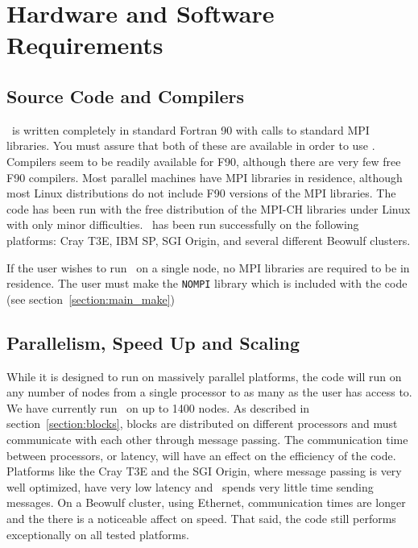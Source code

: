 \section{Hardware and Software Requirements \label{section:requirements}}

\subsection{Source Code and Compilers \label{section:compiler}}

\BATSRUS\ is written completely in standard Fortran 90 with calls to
standard MPI libraries.  You must assure that both of these are available
in order to
use \BATSRUS.  Compilers seem to be readily available for
F90, although there are very few free F90 compilers.  Most parallel
machines have MPI libraries in residence, although most Linux
distributions do not include F90 versions of the MPI libraries.  The
code has been run with the free distribution of the MPI-CH libraries
under Linux with only minor difficulties.
\BATSRUS\ has been run successfully on the following platforms:
Cray T3E, IBM SP, SGI Origin, and several
different Beowulf clusters.

If the user wishes to run \BATSRUS\ on a single node, no MPI libraries
are required to be in residence.  The user must make the {\tt NOMPI}
library which is included with the code (see section~\ref{section:main_make})


\subsection{Parallelism, Speed Up and Scaling \label{scaling}}

While it is designed to run on massively parallel platforms, the
code will run on any number of nodes from a single processor to as
many as the user has access to. We have currently run \BATSRUS\ on up
to 1400 nodes.  As described in section~\ref{section:blocks},
 blocks are distributed on different
processors and must communicate with each other through message passing.
The communication time between processors, or latency, will have an 
effect on the efficiency of the code.  Platforms like the Cray T3E and 
the SGI Origin,
where message passing is very well optimized, have very low latency and
\BATSRUS\ spends very little time sending messages.  On a Beowulf cluster,
using Ethernet, communication times are longer and the there is a noticeable
affect on speed.  That said, the code still performs exceptionally on
all tested platforms.

